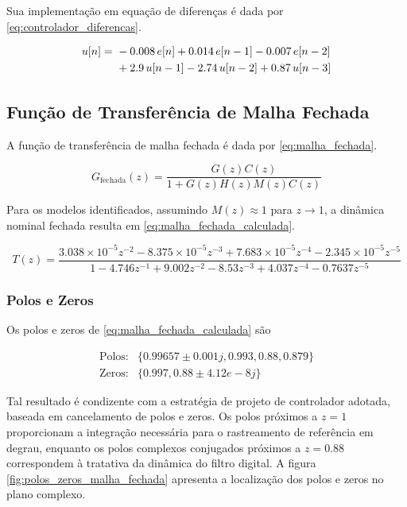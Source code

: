 \documentclass[conference,harvard,brazil,english]{sbatex}
\begin{document}
Sua implementação em equação de diferenças é dada por \ref{eq:controlador_diferencas}.

\begin{align}
    u[n] =\ & -0.008\, e[n] + 0.014\, e[n-1] - 0.007\, e[n-2] \notag \\
           & + 2.9\, u[n-1] - 2.74\, u[n-2] + 0.87\, u[n-3]
    \label{eq:controlador_diferencas}
\end{align}

\subsection{Função de Transferência de Malha Fechada}

A função de transferência de malha fechada é dada por \ref{eq:malha_fechada}.

\begin{equation}
    \label{eq:malha_fechada}
    G_\text{fechada}(z) = \frac{G(z) C(z)}{1 + G(z) H(z) M(z) C(z)}
\end{equation}

Para os modelos identificados, assumindo $M(z) \approx 1$ para $z \to 1$, a dinâmica nominal fechada resulta em \ref{eq:malha_fechada_calculada}.

\begin{equation}
    \label{eq:malha_fechada_calculada}
    T(z) = \frac{3.038 \times 10^{-5} z^{-2} - 8.375 \times 10^{-5} z^{-3} + 7.683 \times 10^{-5} z^{-4} - 2.345 \times 10^{-5} z^{-5} }{1 - 4.746 z^{-1} + 9.002 z^{-2} - 8.53 z^{-3} + 4.037 z^{-4} - 0.7637 z^{-5}}
\end{equation}

\subsubsection{Polos e Zeros}

Os polos e zeros de \ref{eq:malha_fechada_calculada} são

\begin{align}
    \text{Polos}:& \{0.99657 \pm 0.001j, 0.993, 0.88, 0.879\} \\
    \text{Zeros}:& \{0.997, 0.88 \pm 4.12e-8j\}
\end{align}

Tal resultado é condizente com a estratégia de projeto de controlador adotada, baseada em cancelamento de polos e zeros. Os polos próximos a $z = 1$ proporcionam a integração necessária para o rastreamento de referência em degrau, enquanto os polos complexos conjugados próximos a $z = 0.88$ correspondem à tratativa da dinâmica do filtro digital. A figura \ref{fig:polos_zeros_malha_fechada} apresenta a localização dos polos e zeros no plano complexo.
\end{document}

